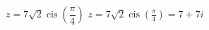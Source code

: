 { $z = 7\sqrt{2}\operatorname{cis}\left(\dfrac{\pi}{4}\right)$}
{ $z = 7\sqrt{2}\operatorname{cis}\left(\frac{\pi}{4}\right) = 7+7i$}
